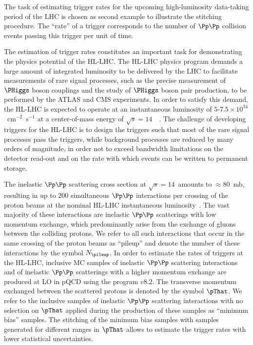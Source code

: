 The task of estimating trigger rates for the upcoming high-luminosity data-taking period of the LHC is chosen as second example to illustrate the stitching procedure.
The ``rate'' of a trigger corresponds to the number of $\Pp\Pp$ collision events passing this trigger per unit of time.

The estimation of trigger rates constitutes an important task for demonstrating the physics potential of the HL-LHC.
The HL-LHC physics program demands a large amount of integrated luminosity to be delivered by the LHC 
to facilitate measurements of rare signal processes,
such as the precise measurement of $\PHiggs$ boson couplings and the study of $\PHiggs$ boson pair production, to be performed by the ATLAS and CMS experiments.
In order to satisfy this demand, the HL-LHC is expected to operate at an instantaneous luminosity of $5$-$7.5 \times 10^{34}$~cm$^{-2}$~s$^{-1}$
at a center-of-mass energy of $\sqrt{s} = 14$~\TeV~\cite{TDR_Phase2_LHC}.
The challenge of developing triggers for the HL-LHC is to design the triggers such that most of the rare signal processes pass the triggers,
while background processes are reduced by many orders of magnitude, in order not to exceed bandwidth limitations on the detector read-out 
and on the rate with which events can be written to permanent storage.

The inelastic $\Pp\Pp$ scattering cross section at $\sqrt{s} = 14$~\TeV amounts to $\approx 80$~mb,
resulting in up to $200$ simultaneous $\Pp\Pp$ interactions per crossing of the proton beams at the nominal HL-LHC instantaneous luminosity~\cite{TDR_Phase2_LHC}.
The vast majority of these interactions are inelastic $\Pp\Pp$ scatterings with low momentum exchange,
which predominantly arise from the exchange of gluons between the colliding protons.
We refer to all such interactions that occur in the same crossing of the proton beams as ``pileup''
and denote the number of these interactions by the symbol $N_{\pileup}$.
In order to estimate the rates of triggers at the HL-LHC,
inclusive MC samples of inelastic $\Pp\Pp$ scattering interactions 
and of inelastic $\Pp\Pp$ scatterings with a higher momentum exchange are produced at LO in pQCD
using the program \PYTHIA $v8.2$.
The transverse momentum exchanged between the scattered protons is denoted by the symbol $\pThat$.
We refer to the inclusive samples of inelastic $\Pp\Pp$ scattering interactions with no selection on $\pThat$ applied during the production of these samples
as ``minimum bias'' samples.
The stitching of the minimum bias samples with samples generated for different ranges in $\pThat$ allows to estimate the trigger rates with lower statistical uncertainties.

